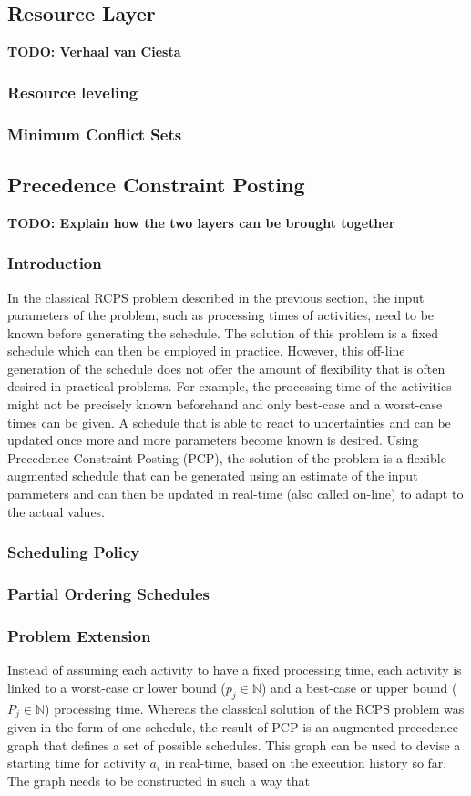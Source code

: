 \documentclass{article}
\newcommand{\TODO}[1]{{\color{red}\textbf{TODO: #1}}}
\begin{document}
\subsection{Resource Layer}
\TODO{Verhaal van Ciesta}
\subsubsection{Resource leveling}
\subsubsection{Minimum Conflict Sets}

\subsection{Precedence Constraint Posting}
\TODO{Explain how the two layers can be brought together}
\subsubsection{Introduction}
In the classical RCPS problem described in the previous section, the input parameters of the problem, such as processing times of activities, need to be known before generating the schedule. The solution of this problem is a fixed schedule which can then be employed in practice. However, this off-line generation of the schedule does not offer the amount of flexibility that is often desired in practical problems. For example, the processing time of the activities might not be precisely known beforehand and only best-case and a worst-case times can be given. A schedule that is able to react to uncertainties and can be updated once more and more parameters become known is desired. Using Precedence Constraint Posting (PCP), the solution of the problem is a flexible augmented schedule that can be generated using an estimate of the input parameters and can then be updated in real-time (also called on-line) to adapt to the actual values.

\subsubsection{Scheduling Policy}
\subsubsection{Partial Ordering Schedules}

\subsubsection{Problem Extension}
Instead of assuming each activity to have a fixed processing time, each activity is linked to a worst-case or lower bound ($p_{j} \in \mathbb{N}$) and a best-case or upper bound ($P_{j} \in \mathbb{N}$) processing time. Whereas the classical solution of the RCPS problem was given in the form of one schedule, the result of PCP is an augmented precedence graph that defines a set of possible schedules. This graph can be used to devise a starting time for activity $a_i$ in real-time, based on the execution history so far. The graph needs to be constructed in such a way that 
\end{document}
